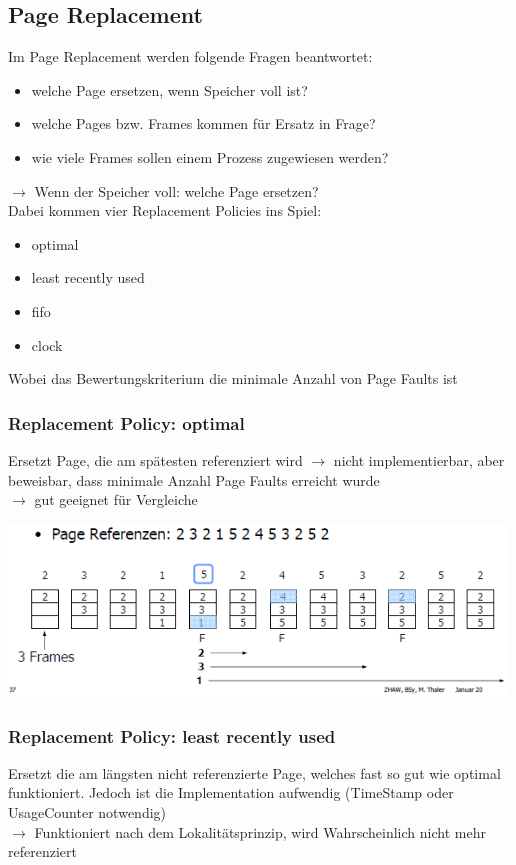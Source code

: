 \documentclass{report}
\newenvironment{Figure}
	{\par\medskip\noindent\minipage{\linewidth}}
	{\endminipage\par\medskip}
\theoremstyle{definition}
\theoremstyle{example}
\begin{document}
	\subsection{Page Replacement}
Im Page Replacement werden folgende Fragen beantwortet:
\begin{itemize}
	\item welche Page ersetzen, wenn Speicher voll ist?
	\item welche Pages bzw. Frames kommen für Ersatz in Frage?
	\item wie viele Frames sollen einem Prozess zugewiesen werden?
\end{itemize}

$\rightarrow$ Wenn der Speicher voll: welche Page ersetzen?\\
Dabei kommen vier Replacement Policies ins Spiel: 
\begin{itemize}
	\item optimal
	\item least recently used
	\item fifo
	\item clock
\end{itemize}
Wobei das Bewertungskriterium die minimale Anzahl von Page Faults ist

		\subsubsection{Replacement Policy: optimal}
Ersetzt Page, die am spätesten referenziert wird $\rightarrow$ nicht implementierbar, aber beweisbar, dass minimale Anzahl Page Faults erreicht wurde\\
$\rightarrow$ gut geeignet für Vergleiche

\begin{Figure}
\centering
\includegraphics[width=500px]{img/ReplacementPolicyOptimal.png}
	\label{fig:Abbildung der ReplacementPolicy: optimal}
\end{Figure}

		\subsubsection{Replacement Policy: least recently used}
Ersetzt die am längsten nicht referenzierte Page, welches fast so gut wie optimal funktioniert. Jedoch ist die Implementation aufwendig (TimeStamp oder UsageCounter notwendig)\\
$\rightarrow$ Funktioniert nach dem Lokalitätsprinzip, wird Wahrscheinlich nicht mehr referenziert
\end{document}
